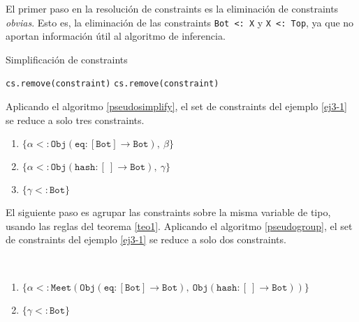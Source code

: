 El primer paso en la resolución de constraints es la eliminación de constraints \textit{obvias}. Esto es, la eliminación de las constraints \texttt{Bot <: X} y \texttt{X <: Top}, ya que no aportan información útil al algoritmo de inferencia.

\begin{algorithm}\captionsetup{labelsep=newline}
  \centering
  \caption{Simplificación de constraints}
  \label{pseudosimplify}
    \begin{algorithmic}[1]
              \State \texttt{cs.remove(constraint)}
              \State \texttt{cs.remove(constraint)}
            \EndIf
          \EndFor
      \EndFunction
    \end{algorithmic}
\end{algorithm}

Aplicando el algoritmo \ref{pseudosimplify}, el set de constraints del ejemplo \ref{ej3-1} se reduce a solo tres constraints.

\begin{enumerate}
  \item $\mathtt{\{\alpha <: Obj(eq : [Bot] \rightarrow Bot),\ \beta\}}$
  \item $\mathtt{\{\alpha <: Obj(hash : [\ ] \rightarrow Bot),\ \gamma\}}$
  \item $\mathtt{\{\gamma <: Bot\}}$
\end{enumerate}

El siguiente paso es agrupar las constraints sobre la misma variable de tipo, usando las reglas del teorema \ref{teo1}. Aplicando el algoritmo \ref{pseudogroup}, el set de constraints del ejemplo \ref{ej3-1} se reduce a solo dos constraints.

\begin{ej}\ \\
  \normalfont
  \label{ej3-2}
  \begin{enumerate}
    \item $\mathtt{\{\alpha <: Meet(Obj(eq : [Bot] \rightarrow Bot),\ Obj(hash : [\ ] \rightarrow Bot))\}}$
    \item $\mathtt{\{\gamma <: Bot\}}$
  \end{enumerate}
\end{ej}

